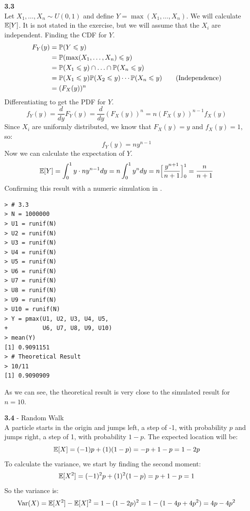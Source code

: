 \newpage\noindent
\textbf{3.3}\\  %
Let $X_1,\ldots, X_n\sim U(0,1)$ and define $Y = \max(X_1,\ldots, X_n)$. We will calculate
$\E[Y]$. It is not stated in the exercise, but we will assume that the $X_i$ are independent.
Finding the CDF for $Y$.
\begin{align*}
    F_Y(y) &= \P(Y\leq y) \\
    &= \P(\max(X_1, \ldots, X_n) \leq y) \\
    &= \P(X_1\leq y)\cap\ldots\cap\P(X_n\leq y) \\
    &= \P(X_1\leq y)\P(X_2\leq y)\cdots\P(X_n\leq y) \tag{Independence}\\
    &= (F_X(y))^n
\end{align*}
Differentiating to get the PDF for $Y$.
$$
f_Y(y) = \frac{d}{dy}F_Y(y) = \frac{d}{dy}(F_X(y))^n = n(F_X(y))^{n-1}f_X(y)
$$
Since $X_i$ are uniformly distributed, we know that $F_X(y) = y$ and $f_X(y) = 1$, so:
$$
f_Y(y) = ny^{n-1}
$$
Now we can calculate the expectation of $Y$.
$$
\E[Y] = \int_0^1 y\cdot ny^{n-1} dy = n\int_0^1 y^n dy = n\Big[\frac{y^{n+1}}{n+1}\Big]_0^1 = \frac{n}{n+1}
$$
Confirming this result with a numeric simulation in \RR.

\begin{lstlisting}[style=RSyntax, title=R]
> # 3.3
> N = 1000000
> U1 = runif(N)
> U2 = runif(N)
> U3 = runif(N)
> U4 = runif(N)
> U5 = runif(N)
> U6 = runif(N)
> U7 = runif(N)
> U8 = runif(N)
> U9 = runif(N)
> U10 = runif(N)
> Y = pmax(U1, U2, U3, U4, U5,
+          U6, U7, U8, U9, U10)
> mean(Y)
[1] 0.9091151
> # Theoretical Result
> 10/11
[1] 0.9090909
\end{lstlisting}
As we can see, the theoretical result is very close to the simulated result for $n=10$.

\newpage\noindent
\textbf{3.4} - Random Walk\\  %
A particle starts in the origin and jumps left, a step of -1, with probability $p$
and jumps right, a step of 1, with probability $1-p$. The expected location will be:
$$
\E[X] = (-1)p + (1)(1-p) = -p + 1 - p = 1 - 2p
$$
To calculate the variance, we start by finding the second moment:
$$
\E[X^2] = (-1)^2p + (1)^2(1-p) = p + 1 - p = 1
$$
So the variance is:
$$
\V(X) = \E[X^2] - \E[X]^2 = 1 - (1 - 2p)^2 = 1 -(1 - 4p + 4p^2) = 4p - 4p^2
$$

